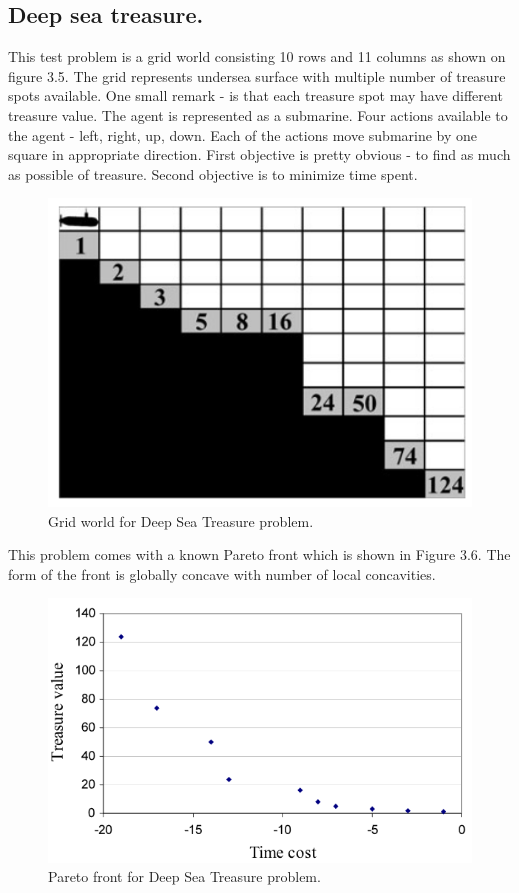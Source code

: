 {{\subsection{Deep sea treasure.}
This test problem is a grid world consisting 10 rows and 11 columns as shown on figure 3.5. The grid represents undersea surface with multiple number of treasure spots available. One small remark - is that each treasure spot may have different treasure value. The agent is represented as a submarine. Four actions available to the agent - left, right, up, down. Each of the actions move submarine by one square in appropriate direction. First objective is pretty obvious - to find as much as possible of treasure. Second objective is to minimize time spent. \\
\begin{figure}[ht]
\vskip 0.2in
\centering
\includegraphics[scale=0.9]{dst.png}
\caption{Grid world for Deep Sea Treasure problem.}
\label{ParetoDominance}
\end{figure}

This problem comes with a known Pareto front which is shown in Figure 3.6. The form of the front is globally concave with number of local concavities.
\begin{figure}[ht]
\vskip 0.2in
\centering
\includegraphics[scale=0.9]{dstPareto.png}
\caption{Pareto front for Deep Sea Treasure problem.}
\label{ParetoDominance}
\end{figure}

}}
